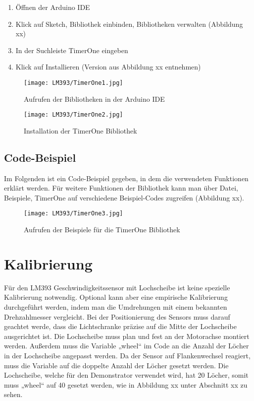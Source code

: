 \begin{enumerate}
	\item Öffnen der Arduino IDE
	\item Klick auf Sketch, Bibliothek einbinden, Bibliotheken verwalten (Abbildung xx)
	\item In der Suchleiste TimerOne eingeben
	\item Klick auf Installieren (Version aus Abbildung xx entnehmen)
\end{enumerate}

\begin{figure}[htpb]
	\centering
	\texttt{[image: LM393/TimerOne1.jpg]}
	\caption{Aufrufen der Bibliotheken in der Arduino IDE}
	\label{fig:BibTimerOne}
\end{figure}

\begin{figure}[htpb]
	\centering
	\texttt{[image: LM393/TimerOne2.jpg]}
	\caption{Installation der TimerOne Bibliothek}
	\label{fig:InstTimerOne}
\end{figure}

\subsection{Code-Beispiel}

Im Folgenden ist ein Code-Beispiel gegeben, in dem die verwendeten Funktionen erklärt werden. Für weitere Funktionen der Bibliothek kann man über Datei, Beispiele, TimerOne auf verschiedene Beispiel-Codes zugreifen (Abbildung xx).

\begin{figure}[htpb]
	\centering
	\texttt{[image: LM393/TimerOne3.jpg]}
	\caption{Aufrufen der Beispiele für die TimerOne Bibliothek}
	\label{fig:ExamplesTimerOne1}
\end{figure}

\section{Kalibrierung}

Für den LM393 Geschwindigkeitssensor mit Lochscheibe ist keine spezielle Kalibrierung notwendig. Optional kann aber eine empirische Kalibrierung durchgeführt werden, indem man die Umdrehungen mit einem bekannten Drehzahlmesser vergleicht. Bei der Positionierung des Sensors muss darauf geachtet werde, dass die Lichtschranke präzise auf die Mitte der Lochscheibe ausgerichtet ist. Die Lochscheibe muss plan und fest an der Motorachse montiert werden. Außerdem muss die Variable „wheel“ im Code an die Anzahl der Löcher in der Lochscheibe angepasst werden. Da der Sensor auf Flankenwechsel reagiert, muss die Variable auf die doppelte Anzahl der Löcher gesetzt werden. Die Lochscheibe, welche für den Demonstrator verwendet wird, hat 20 Löcher, somit muss „wheel“ auf 40 gesetzt werden, wie in Abbildung xx unter Abschnitt xx zu sehen. 

